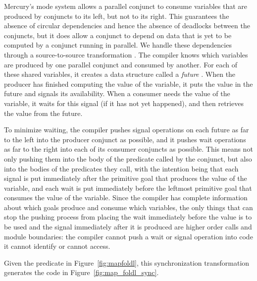 Mercury's mode system allows a parallel conjunct to consume variables
that are produced by conjuncts to its left, but not to its right.
This guarantees the absence of circular dependencies
and hence the absence of deadlocks between the conjuncts,
but it does allow a conjunct to depend on data that is yet to be computed
by a conjunct running in parallel.
We handle these dependencies through a source-to-source transformation
\cite{wang_dep_par_conj}.
The compiler knows which variables
are produced by one parallel conjunct and consumed by another.
For each of these shared variables,
it creates a data structure called a \emph{future} \cite{multilisp}.
When the producer has finished computing the value of the variable,
it puts the value in the future and signals its availability.
When a consumer needs the value of the variable,
it waits for this signal (if it has not yet happened),
and then retrieves the value from the future.


To minimize waiting,
the compiler pushes signal operations on each future
as far to the left into the producer conjunct as possible,
and it pushes wait operations
as far to the right into each of its consumer conjuncts as possible.
This means not only pushing them
into the body of the predicate called by the conjunct,
but also into the bodies of the predicates they call,
with the intention being that
each signal is put immediately after
the primitive goal that produces the value of the variable,
and each wait is put immediately before
the leftmost primitive goal that consumes the value of the variable.
Since the compiler has complete information
about which goals produce and consume which variables,
the only things that can stop the pushing process from placing the
wait immediately before the value is to be used and the signal
immediately after it is produced are
higher order calls and module boundaries:
the compiler cannot push a wait or signal operation
into code it cannot identify or cannot access.


Given the \mapfoldl predicate in Figure~\ref{fig:mapfoldl},
this synchronization transformation
generates the code in Figure~\ref{fig:map_foldl_sync}.

